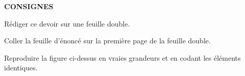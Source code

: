 \vskip 1cm

\centerline{\textbf{CONSIGNES}}

\vskip 1cm
\begin{myenumerate}
    \item Rédiger ce devoir sur une feuille double.
    \item Coller la feuille d'énoncé sur la première page de la
    feuille double.
    \item Reproduire la figure ci-dessus en vraies grandeurs et en
    codant les éléments identiques.
\end{myenumerate}